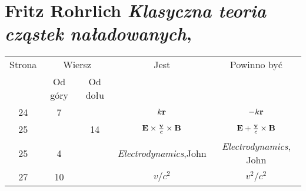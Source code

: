 \documentclass[a4paper,11pt]{article}
\numberwithin{equation}{section}
\begin{document}
















\section{Fritz Rohrlich \textit{Klasyczna teoria cząstek
    naładowanych},
  \parencite{RohrlichKlasycznaTeoriaCzastekNaladowanych1981}}


\vspace{0em}



\vspace{0em}












\begin{center}

  \begin{tabular}{|c|c|c|c|c|}
    \hline
    Strona & \multicolumn{2}{c|}{Wiersz} & Jest & Powinno być \\ \cline{2-3}
    & Od góry & Od dołu &  &  \\ \hline
    24 & 7 & & $k \mathbf{r}$ & $-k \mathbf{r}$ \\
    25 & & 14 & $\mathbf{E} \times \frac{ \mathbf{v} }{ c } \times \mathbf{B}$
           & $\mathbf{E} + \frac{ \mathbf{v} }{ c } \times \mathbf{B}$ \\
    25 & 4 & & \textit{Electrodynamics},John
           & \textit{Electrodynamics}, John \\
    27 & 10 & & $v / c^{ 2 }$ & $v^{ 2 } / c^{ 2 }$ \\
    \hline
  \end{tabular}

\end{center}
\end{document}
